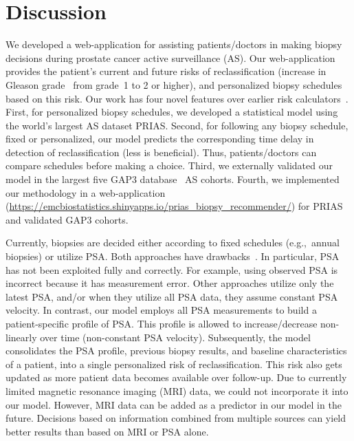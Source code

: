 \section{Discussion}
We developed a web-application for assisting patients/doctors in making biopsy decisions during prostate cancer active surveillance (AS). Our web-application provides the patient's current and future risks of reclassification (increase in Gleason grade~\citep{epsteinGG2014} from grade~1 to 2 or higher), and personalized biopsy schedules based on this risk. Our work has four novel features over earlier risk calculators~\citep{coley2017prediction,ankerst2015precision}. First, for personalized biopsy schedules, we developed a statistical model using the world's largest AS dataset PRIAS. Second, for following any biopsy schedule, fixed or personalized, our model predicts the corresponding time delay in detection of reclassification (less is beneficial). Thus, patients/doctors can compare schedules before making a choice. Third, we externally validated our model in the largest five GAP3 database~\citep{gap3_2018} AS cohorts. Fourth, we implemented our methodology in a web-application (\url{https://emcbiostatistics.shinyapps.io/prias_biopsy_recommender/}) for PRIAS and validated GAP3 cohorts.

Currently, biopsies are decided either according to fixed schedules (e.g.,~annual biopsies) or utilize PSA. Both approaches have drawbacks~\citep{vickers2009psavelocity,bokhorst2015compliance}. In particular, PSA has not been exploited fully and correctly. For example, using observed PSA is incorrect because it has measurement error. Other approaches utilize only the latest PSA, and/or when they utilize all PSA data, they assume constant PSA velocity. In contrast, our model employs all PSA measurements to build a patient-specific profile of PSA. This profile is allowed to increase/decrease non-linearly over time (non-constant PSA velocity). Subsequently, the model consolidates the PSA profile, previous biopsy results, and baseline characteristics of a patient, into a single personalized risk of reclassification. This risk also gets updated as more patient data becomes available over follow-up. Due to currently limited magnetic resonance imaging (MRI) data, we could not incorporate it into our model. However, MRI data can be added as a predictor in our model in the future. Decisions based on information combined from multiple sources can yield better results than based on MRI or PSA alone.

